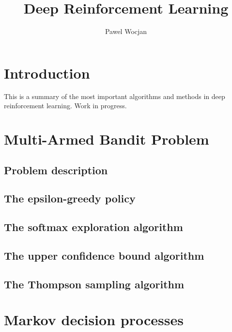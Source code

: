 \documentclass[12pt]{book}
\newcommand{\<}{\langle}
\renewcommand{\>}{\rangle}
\begin{document}
\title{Deep Reinforcement Learning}

\author{Pawel Wocjan}

\maketitle

\tableofcontents


%
%
%

\chapter{Introduction}

This is a summary of the most important algorithms and methods in deep reinforcement learning. Work in progress.

%
%
%

\chapter{Multi-Armed Bandit Problem}

\section{Problem description}

\section{The epsilon-greedy policy}

\section{The softmax exploration algorithm}

\section{The upper confidence bound algorithm}

\section{The Thompson sampling algorithm}

%
%
%

\chapter{Markov decision processes}
\end{document}
